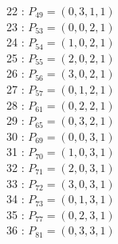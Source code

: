 \documentclass{article}
\begin{document}
{\begin{multicols}{3}
22 : $P_{49}=( 0, 3, 1, 1 )$\\
23 : $P_{53}=( 0, 0, 2, 1 )$\\
24 : $P_{54}=( 1, 0, 2, 1 )$\\
25 : $P_{55}=( 2, 0, 2, 1 )$\\
26 : $P_{56}=( 3, 0, 2, 1 )$\\
27 : $P_{57}=( 0, 1, 2, 1 )$\\
28 : $P_{61}=( 0, 2, 2, 1 )$\\
29 : $P_{65}=( 0, 3, 2, 1 )$\\
30 : $P_{69}=( 0, 0, 3, 1 )$\\
31 : $P_{70}=( 1, 0, 3, 1 )$\\
32 : $P_{71}=( 2, 0, 3, 1 )$\\
33 : $P_{72}=( 3, 0, 3, 1 )$\\
34 : $P_{73}=( 0, 1, 3, 1 )$\\
35 : $P_{77}=( 0, 2, 3, 1 )$\\
36 : $P_{81}=( 0, 3, 3, 1 )$\\
\end{multicols}


%


%


}%
\end{document}
